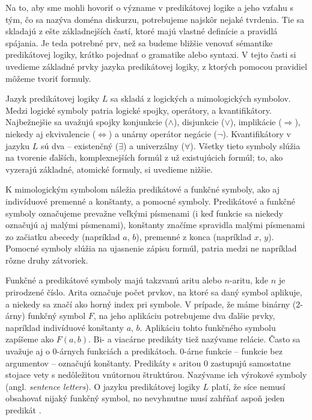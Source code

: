 \documentclass[12pt, letterpaper]{article}
\begin{document}
Na to, aby sme mohli hovoriť o význame v predikátovej logike a jeho vzťahu s tým, čo sa nazýva doména diskurzu, potrebujeme najskôr nejaké tvrdenia. Tie sa skladajú z ešte základnejších častí, ktoré majú vlastné definície a pravidlá spájania. Je teda potrebné prv, než sa budeme bližšie venovať sémantike predikátovej logiky, krátko pojednať o gramatike alebo syntaxi. V tejto časti si uvedieme základné prvky jazyka predikátovej logiky, z ktorých pomocou pravidiel môžeme tvoriť formuly.\par
Jazyk predikátovej logiky $L$ sa skladá z logických a mimologických symbolov. Medzi logické symboly patria logické spojky, operátory, a kvantifikátory. Najbežnejšie sa uvažujú spojky konjunkcie ($\land$), disjunkcie ($\lor$), implikácie ($\Rightarrow$), niekedy aj ekvivalencie ($\iff$) a unárny operátor negácie ($\neg$). Kvantifikátory v jazyku $L$ sú dva -- existenčný ($\exists$) a univerzálny ($\forall$). Všetky tieto symboly slúžia na tvorenie ďalších, komplexnejších formúl z už existujúcich formúl; to, ako vyzerajú základné, atomické formuly, si uvedieme nižšie.\par 
K mimologickým symbolom náležia predikátové a funkčné symboly, ako aj indivíduové premenné a konštanty, a pomocné symboly. Predikátové a funkčné symboly označujeme prevažne veľkými písmenami (i keď funkcie sa niekedy označujú aj malými písmenami), konštanty značíme spravidla malými písmenami zo začiatku abecedy (napríklad $a$, $b$), premenné z konca (napríklad $x$, $y$). Pomocné symboly slúžia na ujasnenie zápisu formúl, patria medzi ne napríklad rôzne druhy zátvoriek.\par
Funkčné a predikátové symboly majú takzvanú aritu alebo $n$-aritu, kde $n$ je prirodzené číslo. Arita označuje počet prvkov, na ktoré sa daný symbol aplikuje, a niekedy sa značí ako horný index pri symbole. V prípade, že máme binárny (2-árny) funkčný symbol $F$, na jeho aplikáciu potrebujeme dva ďalšie prvky, napríklad indivíduové konštanty $a$, $b$. Aplikáciu tohto funkčného symbolu zapíšeme ako $F(a, b)$. Bi- a viacárne predikáty tiež nazývame relácie. Často sa uvažuje aj o $0$-árnych funkciách a predikátoch. $0$-árne funkcie -- funkcie bez argumentov -- označujú konštanty. Predikáty s aritou $0$ zastupujú samostatne stojace vety s nedôležitou vnútornou štruktúrou. Nazývame ich výrokové symboly (angl. \textit{sentence letters}). O jazyku predikátovej logiky $L$ platí, že síce nemusí obsahovať nijaký funkčný symbol, no nevyhnutne musí zahŕňať aspoň jeden predikát \parencites[47, 53]{mendelson_introduction_2015}[301]{peregrin_filosofie_2017}[34]{raclavsky_uvod_2015}{shapiro_classical_2022}[137--138]{svejdar_logika_2002}.\par 
\end{document}
